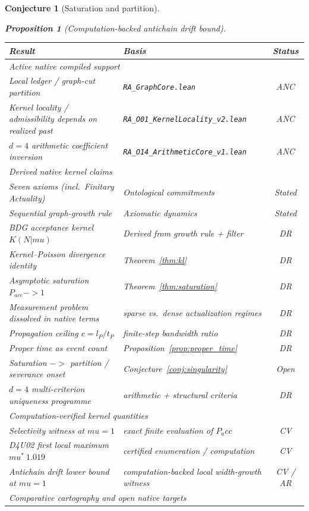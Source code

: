 \documentclass[11pt]{article}
\def\ell{l}%
\def\mu{mu}%
\def\mathrm#1{#1}%
\def\mathbf#1{#1}%
\def\approx{~}%
\def\to{->}%
\def\Pacc{P_acc}%
\newtheorem{proposition}{Proposition}
\newtheorem{conjecture}{Conjecture}
\newcommand{\Pacc}{P_{\mathrm{acc}}}
\begin{document}
\begin{conjecture}[Saturation and partition]
\begin{proposition}[Computation-backed antichain drift bound]
\begin{center}
\begin{tabular}{llc}
\toprule
Result & Basis & Status \\
\midrule
\multicolumn{3}{l}{\textit{Active native compiled support}} \\
Local ledger / graph-cut partition & \texttt{RA\_GraphCore.lean} & ANC \\
Kernel locality / admissibility depends on realized past & \texttt{RA\_O01\_KernelLocality\_v2.lean} & ANC \\
$d=4$ arithmetic coefficient inversion & \texttt{RA\_O14\_ArithmeticCore\_v1.lean} & ANC \\
\midrule
\multicolumn{3}{l}{\textit{Derived native kernel claims}} \\
Seven axioms (incl.\ Finitary Actuality) & Ontological commitments & Stated \\
Sequential graph-growth rule & Axiomatic dynamics & Stated \\
BDG acceptance kernel $K(\mathbf{N}|\mu)$ & Derived from growth rule + filter & DR \\
Kernel--Poisson divergence identity & Theorem~\ref{thm:kl} & DR \\
Asymptotic saturation $P_{\mathrm{acc}}\to 1$ & Theorem~\ref{thm:saturation} & DR \\
Measurement problem dissolved in native terms & sparse vs.\ dense actualization regimes & DR \\
Propagation ceiling $c=\ell_P/t_P$ & finite-step bandwidth ratio & DR \\
Proper time as event count & Proposition~\ref{prop:proper_time} & DR \\
Saturation $\to$ partition / severance onset & Conjecture~\ref{conj:singularity} & Open \\
$d=4$ multi-criterion uniqueness programme & arithmetic + structural criteria & DR \\
\midrule
\multicolumn{3}{l}{\textit{Computation-verified kernel quantities}} \\
Selectivity witness at $\mu=1$ & exact finite evaluation of $\Pacc$ & CV \\
D4U02 first local maximum $\mu^*\approx 1.019$ & certified enumeration / computation & CV \\
Antichain drift lower bound at $\mu=1$ & computation-backed local width-growth witness & CV / AR \\
\midrule
\multicolumn{3}{l}{\textit{Comparative cartography and open native targets}} \\

\end{tabular}
\end{center}
\end{proposition}
\end{conjecture}
\end{document}
